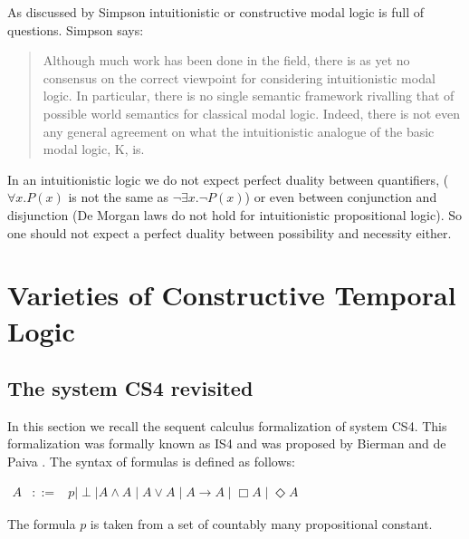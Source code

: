 \documentclass{article}
\begin{document}
As discussed by Simpson intuitionistic or constructive modal logic is full of questions. Simpson says:
\begin{quote}
Although much work has been done in the field, there is as yet no consensus
on the correct viewpoint for considering intuitionistic modal logic.  In particular,
there is no single semantic framework rivalling that of possible  world semantics
for classical modal logic.  Indeed, there is not even any general agreement on what
the intuitionistic analogue of the basic modal logic, K, is. 
\end{quote}
In an intuitionistic logic we do not expect perfect duality between quantifiers, ($\forall x.P(x)$ is not the same as $\neg \exists x.\neg P(x)$) or even between conjunction and disjunction (De Morgan laws do not hold for intuitionistic propositional logic). So one should not expect a perfect duality between possibility and necessity either.

\section{Varieties of Constructive Temporal Logic}

\subsection{The  system CS4 revisited} 

In this section we recall the sequent calculus formalization of system CS4.  This formalization was formally known as IS4 and was proposed by Bierman and de Paiva \cite{CS4}.  The syntax of formulas is defined as follows:
\begin{center}
    \begin{math}
        \begin{array}{lllllllll}
            A & ::= & p \mid \perp \mid A \land A \mid A \lor A \mid A \to A \mid \Box A \mid \Diamond A
        \end{array}
    \end{math}
\end{center}
The formula $p$ is taken from a set of countably many propositional
constant.
\end{document}
